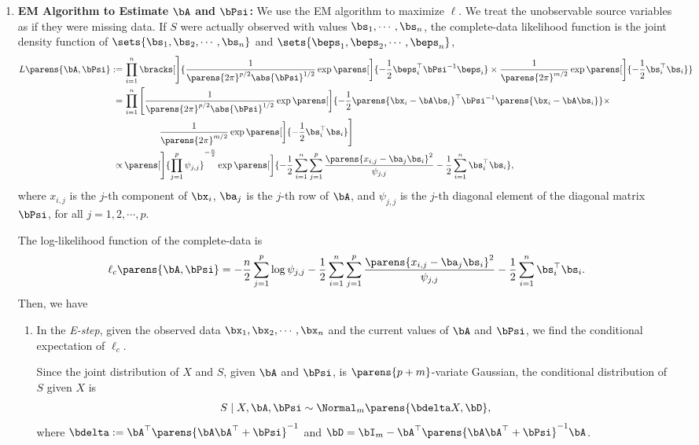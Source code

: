 \documentclass[12pt]{article}
\begin{document}
\begin{enumerate}[label=\textbf{\arabic*.}]
	\item \textbf{EM Algorithm to Estimate $\bA$ and $\bPsi$:} We use the EM algorithm to maximize $\ell$. We treat the unobservable source variables as if they were missing data. If $S$ were actually observed with values $\bs_1, \cdots, \bs_n$, the complete-data likelihood function is the joint density function of $\sets{\bs_1, \bs_2, \cdots, \bs_n}$ and $\sets{\beps_1, \beps_2, \cdots, \beps_n}$, 
	\begin{align}
		L \parens{\bA, \bPsi} := & \, \prod_{i=1}^n \bracks[\Bigg]{\frac{1}{\parens{2 \pi}^{p/2} \abs{\bPsi}^{1/2} } \exp \parens[\bigg]{-\frac{1}{2} \beps_i^\top \bPsi^{-1} \beps_i} \times \frac{1}{\parens{2\pi}^{m/2}} \exp \parens[\bigg]{- \frac{1}{2} \bs_i^\top \bs_i}} \nonumber \\ 
		= & \, \prod_{i=1}^n \Bigg[\frac{1}{\parens{2 \pi}^{p/2} \abs{\bPsi}^{1/2} } \exp \parens[\bigg]{-\frac{1}{2} \parens{\bx_i - \bA \bs_i}^\top \bPsi^{-1} \parens{\bx_i - \bA \bs_i}} \times \nonumber \\ 
		& \qquad \qquad \frac{1}{\parens{2\pi}^{m/2}} \exp \parens[\bigg]{- \frac{1}{2} \bs_i^\top \bs_i} \Bigg] \nonumber \\ 
		\propto & \, \parens[\Bigg]{ \prod_{j=1}^p \psi_{j,j} }^{-\frac{n}{2}} \exp \parens[\bigg]{-\frac{1}{2} \sum_{i=1}^n \sum_{j=1}^p \frac{\parens{x_{i,j} - \ba_j \bs_i}^2}{\psi_{j,j}} - \frac{1}{2} \sum_{i=1}^n \bs_i^\top \bs_i}, 
	\end{align}
	where $x_{i, j}$ is the $j$-th component of $\bx_i$, $\ba_j$ is the $j$-th row of $\bA$, and $\psi_{j,j}$ is the $j$-th diagonal element of the diagonal matrix $\bPsi$, for all $j = 1, 2, \cdots, p$. 
	
	The log-likelihood function of the complete-data is 
	\begin{align}
		\ell_{c} \parens{\bA, \bPsi} = -\frac{n}{2} \sum_{j=1}^p \log \psi_{j,j} - \frac{1}{2} \sum_{i=1}^n \sum_{j=1}^p \frac{\parens{x_{i,j} - \ba_j \bs_i}^2}{\psi_{j,j}} - \frac{1}{2} \sum_{i=1}^n \bs_i^\top \bs_i. 
	\end{align}
	Then, we have 
	\begin{enumerate}
		\item In the \emph{E-step}, given the observed data $\bx_1, \bx_2, \cdots, \bx_n$ and the current values of $\bA$ and $\bPsi$, we find the conditional expectation of $\ell_c$. 
		
		Since the joint distribution of $X$ and $S$, given $\bA$ and $\bPsi$, is $\parens{p + m}$-variate Gaussian, the conditional distribution of $S$ given $X$ is 
		\begin{align*}
			S \mid X, \bA, \bPsi \sim \Normal_m \parens{\bdelta X, \bD}, 
		\end{align*}
		where $\bdelta := \bA^\top \parens{\bA \bA^\top + \bPsi}^{-1}$ and $\bD = \bI_m - \bA^\top \parens{\bA \bA^\top + \bPsi}^{-1} \bA$. 
		

\end{enumerate}
\end{enumerate}
\end{document}
